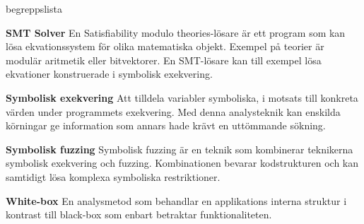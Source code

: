 \begin{labeling}{begreppslista}
  \item [\textbf{SMT Solver}] En Satisfiability modulo theories-lösare är ett
      program som kan lösa ekvationssystem för olika matematiska objekt. Exempel
      på teorier är modulär aritmetik eller bitvektorer. En SMT-lösare kan till
      exempel lösa ekvationer konstruerade i symbolisk exekvering.

  \item [\textbf{Symbolisk exekvering}] Att tilldela variabler symboliska, i
      motsats till konkreta värden under programmets exekvering. Med denna
      analysteknik kan enskilda körningar ge information som annars hade krävt
      en uttömmande sökning.

  \item [\textbf{Symbolisk fuzzing}] Symbolisk fuzzing är en teknik som
    kombinerar teknikerna symbolisk exekvering och fuzzing. Kombinationen 
    bevarar kodstrukturen och kan samtidigt lösa komplexa symboliska
    restriktioner.  
    
  \item [\textbf{White-box}] En analysmetod som behandlar en applikations
  interna struktur i kontrast till black-box som enbart betraktar
  funktionaliteten.
\end{labeling}
